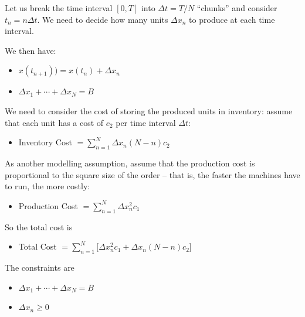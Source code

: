 \documentclass{workbook}
\begin{document}
\begin{solution}
\begin{slide}

Let us break the time interval $[0,T]$ into $\Delta t = T/N$ ``chunks'' and consider $t_n=n \Delta t$. We need to decide how many units $\Delta x_n$ to produce at each time interval.

We then have:
\begin{itemize}
	\item $x(t_{n+1})) = x(t_n) + \Delta x_n$
	\item $\Delta x_1 + \cdots + \Delta x_N = B$
\end{itemize}

We need to consider the cost of storing the produced units in inventory: assume that each unit has a cost of $c_2$ per time interval $\Delta t$:
\begin{itemize}
	\item Inventory Cost $\displaystyle = \sum_{n=1}^N \Delta x_n (N-n) c_2$
\end{itemize}

As another modelling assumption, assume that the production cost is proportional to the square size of the order -- that is, the faster the machines have to run, the more costly:
\begin{itemize}
	\item Production Cost $\displaystyle = \sum_{n=1}^N \Delta x_n^2 c_1	$
\end{itemize}

So the total cost is
\begin{itemize}
	\item Total Cost $\displaystyle = \sum_{n=1}^N \bigg[ \Delta x_n^2 c_1 + \Delta x_n (N-n) c_2 \bigg]$
\end{itemize}

The constraints are
\begin{itemize}
	\item $\Delta x_1 + \cdots + \Delta x_N = B$
	\item $\Delta x_n \geq 0$
\end{itemize}

\end{slide}
\end{solution}
\end{document}
